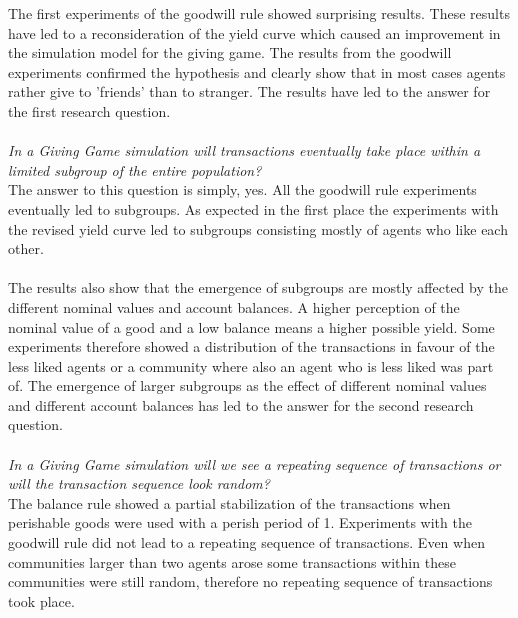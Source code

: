 \documentclass[twoside,openright]{uva-bachelor-thesis}
\begin{document}
The first experiments of the goodwill rule showed surprising results. These results have led to a reconsideration of the yield curve which caused an improvement in the simulation model for the giving game. The results from the goodwill experiments confirmed the hypothesis and clearly show that in most cases agents rather give to 'friends' than to stranger. The results have led to the answer for the first research question. \\ 
\\
\textit{In a Giving Game simulation will transactions eventually take place within a limited subgroup of the entire population?} \\
The answer to this question is simply, yes. All the goodwill rule experiments eventually led to subgroups. As expected in the first place the experiments with the revised yield curve led to subgroups consisting mostly of agents who like each other. 
\\
\\
The results also show that the emergence of subgroups are mostly affected by the different nominal values and account balances. A higher perception of the nominal value of a good and a low balance means a higher possible yield. Some experiments therefore showed a distribution of the transactions in favour of the less liked agents or a community where also an agent who is less liked was part of. The emergence of larger subgroups as the effect of different nominal values and different account balances has led to the answer for the second research question.
\\
\\
\textit{In a Giving Game simulation will we see a repeating sequence of transactions or will the transaction sequence look random?} \\
The balance rule showed a partial stabilization of the transactions when perishable goods were used with a perish period of 1. Experiments with the goodwill rule did not lead to a repeating sequence of transactions. Even when communities larger than two agents arose some transactions within these communities were still random, therefore no repeating sequence of transactions took place.
\end{document}
